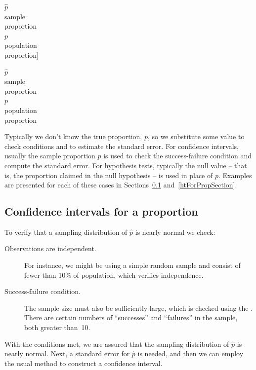 $\hat{p}$\vspace{0mm}\\\footnotesize sample\\proportion\vspace{3mm}\\\normalsize$p$\vspace{0mm}\\\footnotesize population\\proportion]{\raggedright\vspace{-53mm}

$\hat{p}$\vspace{0mm}\\\footnotesize sample\\proportion\vspace{3mm}\\\normalsize$p$\vspace{0mm}\\\footnotesize population\\proportion}

Typically we don't know the true proportion, $p$, so we substitute some value to check conditions and to estimate the standard error. For confidence intervals, usually the sample proportion $\hat{p}$ is used to check the success-failure condition and compute the standard error. For hypothesis tests, typically the null value -- that is, the proportion claimed in the null hypothesis -- is used in place of $p$. Examples are presented for each of these cases in Sections~\ref{confIntForPropSection} and~\ref{htForPropSection}.



\subsection{Confidence intervals for a proportion}
\label{confIntForPropSection}


To verify that a sampling distribution of $\hat{p}$ is nearly normal we check:
\begin{description}
\item[Observations are independent.] For instance, we might be using a simple random sample and consist of fewer than 10\% of population, which verifies independence.
\item[Success-failure condition.] The sample size must also be sufficiently large, which is checked using the . There are certain numbers of ``successes'' and ``failures'' in the sample, both greater than~10.
\end{description}
With the conditions met, we are assured that the sampling distribution of $\hat{p}$ is nearly normal. Next, a standard error for $\hat{p}$ is needed, and then we can employ the usual method to construct a confidence interval.

